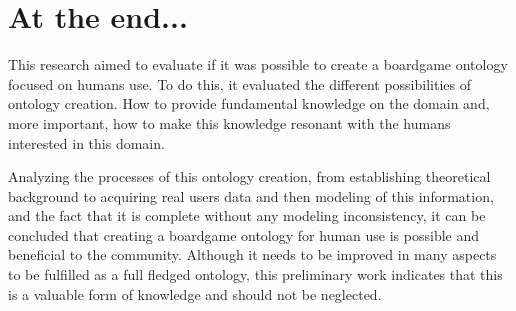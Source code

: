 \section{At the end...}

This research aimed to evaluate if it was possible to create a boardgame ontology focused on humans use. To do this, it evaluated the different possibilities of ontology creation. How to provide fundamental knowledge on the domain and, more important, how to make this knowledge resonant with the humans interested in this domain.

Analyzing the processes of this ontology creation, from establishing theoretical background to acquiring real users data and then modeling of this information, and the fact that it is complete without any modeling inconsistency, it can be concluded that creating a boardgame ontology for human use is possible and beneficial to the community. Although it needs to be improved in many aspects to be fulfilled as a full fledged ontology, this preliminary work indicates that this is a valuable form of knowledge and should not be neglected. 